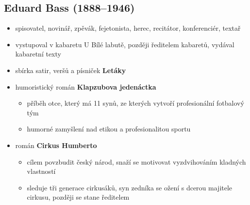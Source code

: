 \subsection{Eduard Bass (1888--1946)}
\begin{itemize}
\item spisovatel, novinář, zpěvák, fejetonista, herec, recitátor, konferenciér, textař
\item vystupoval v kabaretu U Bílé labutě, později ředitelem kabaretů, vydával kabaretní texty
\item sbírka satir, veršů a písniček \textbf{Letáky}
\item humoristický román \textbf{Klapzubova jedenáctka}
	\begin{itemize}
	\item příběh otce, který má 11 synů, ze kterých vytvoří profesionální fotbalový tým
	\item humorné zamyšlení nad etikou a profesionalitou sportu
	\end{itemize}
\item román \textbf{Cirkus Humberto}
	\begin{itemize}
	\item cílem povzbudit český národ, snaží se motivovat vyzdvihováním kladných vlastností
	\item sleduje tři generace cirkusáků, syn zedníka se ožení s dcerou majitele cirkusu, později se stane ředitelem
	\end{itemize}
\end{itemize}


